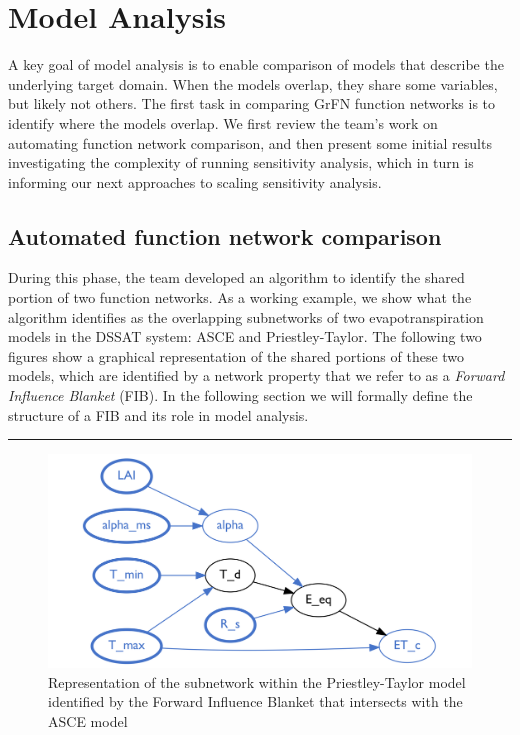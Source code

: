\documentclass[article, 12pt, oneside]{memoir}
\begin{document}
\hypertarget{model-analysis}{%
\section{Model Analysis}\label{model-analysis}}

A key goal of model analysis is to enable comparison of models that
describe the underlying target domain. When the models overlap, they
share some variables, but likely not others. The first task in comparing
GrFN function networks is to identify where the models overlap. We first
review the team's work on automating function network comparison, and
then present some initial results investigating the complexity of
running sensitivity analysis, which in turn is informing our next
approaches to scaling sensitivity analysis.

\hypertarget{automated-function-network-comparison}{%
\subsection{Automated function network
comparison}\label{automated-function-network-comparison}}

During this phase, the team developed an algorithm to identify the
shared portion of two function networks. As a working example, we show
what the algorithm identifies as the overlapping subnetworks of two
evapotranspiration models in the DSSAT system: ASCE and
Priestley-Taylor. The following two figures show a graphical
representation of the shared portions of these two models, which are
identified by a network property that we refer to as a \emph{Forward
Influence Blanket} (FIB). In the following section we will formally
define the structure of a FIB and its role in model analysis.

\begin{center}\rule{0.5\linewidth}{\linethickness}\end{center}

\begin{figure}
\centering
\includegraphics{figs/full-pt-cmb.png}
\caption{Representation of the subnetwork within the Priestley-Taylor
model identified by the Forward Influence Blanket that intersects with
the ASCE model}
\end{figure}
\end{document}
